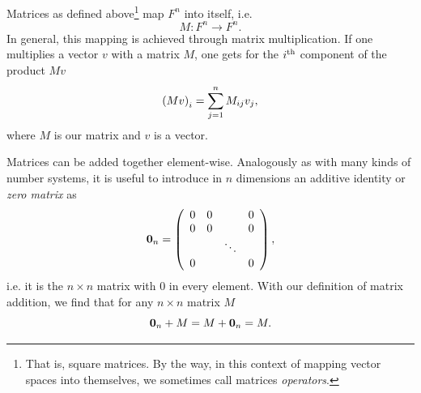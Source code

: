 Matrices as defined above\footnote{That is, square matrices. By the way,
in this context of mapping vector spaces into themselves, we sometimes
call matrices {\it operators}.} map $F^n$ into itself, i.e.
\begin{equation}\label{eq:operatorDef}
  M:F^n\to F^n.
\end{equation}
In general, this mapping is achieved through matrix multiplication. If one
multiplies a vector $v$ with a matrix $M$, one gets for the $i{}^{\rm th}$ component
of the product $Mv$
\begin{equation}\label{eq:matTimesVec}
  \left(Mv\right)_{i}=\sum_{j=1}^n M_{ij}v_j,
\end{equation}
where $M$ is our matrix and $v$ is a vector.

Matrices can be added together element-wise.
Analogously as with many kinds of number systems, it is useful to introduce
in $n$ dimensions an additive identity or {\it zero matrix} as
\begin{equation}
  {\mathbf 0}_n=\left(\begin{array}{cccc}
          0   & 0 &       & 0\\
          0   & 0 &       & 0\\
              &   & \ddots& \\
          0   &   &       & 0
            \end{array}\right), 
\end{equation}
i.e. it is the $n\times n$ matrix with 0 in every element. With our definition
of matrix addition, we find that for any $n\times n$ matrix $M$
\begin{equation}
{\mathbf 0}_n+M=M+{\mathbf 0}_n=M.
\end{equation}

